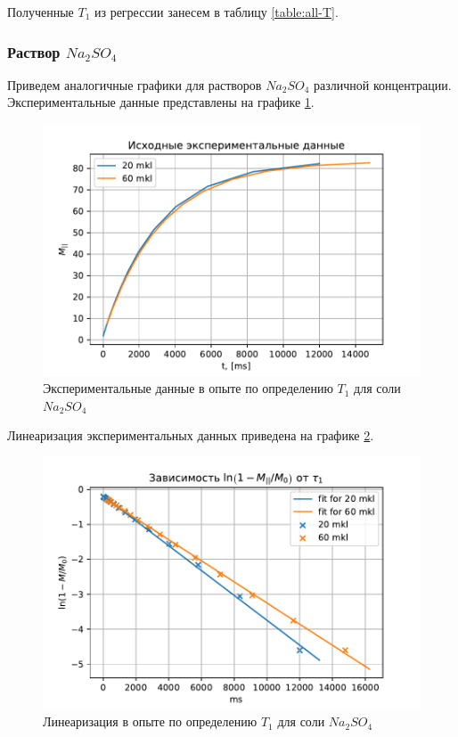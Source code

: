 Полученные $ T_1 $ из регрессии занесем в таблицу \ref{table:all-T}.

\subsubsection{Раствор $Na_2 SO_4$}
Приведем аналогичные графики для растворов $ Na_2 SO_4 $ различной концентрации. Экспериментальные данные представлены на графике \ref{fig:nat1exp}.

\begin{figure}[h]
	\hspace{-5em}
	\includegraphics[width=1.2\linewidth]{data/Na_T_1_exp}
	\caption{Экспериментальные данные в опыте по определению $ T_1 $ для соли $ Na_2 SO_4 $}
	\label{fig:nat1exp}
\end{figure}

Линеаризация экспериментальных данных приведена на графике \ref{fig:nat1reg}.
	
\begin{figure}[h]
	\hspace{-5em}
	\includegraphics[width=1.2\linewidth]{data/Na_T_1_reg}
	\caption{Линеаризация в опыте по определению $ T_1 $ для соли $ Na_2 SO_4 $}
	\label{fig:nat1reg}
\end{figure}

